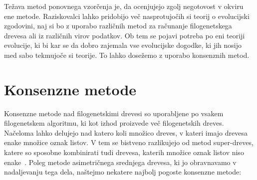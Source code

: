 \documentclass[a4paper, 12pt]{book}
\begin{document}
Težava metod ponovnega vzorčenja je, da ocenjujejo zgolj negotovost v okviru ene metode. Raziskovalci lahko pridobijo več nasprotujočih si teorij o evolucijski zgodovini, naj si bo z uporabo različnih metod za računanje filogenetskega drevesa ali iz različnih virov podatkov. Ob tem se pojavi potreba po eni teoriji evolucije, ki bi kar se da dobro zajemala vse evolucijske dogodke, ki jih nosijo med sabo tekmujoče si teorije. To lahko dosežemo z uporabo konsenznih metod.

\section{Konsenzne metode}
Konsenzne metode nad filogenetskimi drevesi so uporabljene po vsakem filogenetskem algoritmu, ki kot izhod proizvede več filogenetskih dreves. Načeloma lahko delujejo nad katero koli množico dreves, v kateri imajo drevesa enake množice oznak listov. V tem se bistveno razlikujejo od metod super-dreves, katere so sposobne kombinirati tudi drevesa, katerih množice oznak listov niso enake~\cite{bw}. Poleg metode asimetričnega srednjega drevesa, ki jo obravnavamo v nadaljevanju tega dela, naštejmo nekatere najbolj pogoste konsenzne metode:
\end{document}
